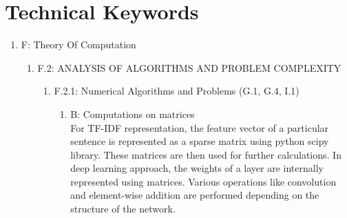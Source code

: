 \documentclass[oneside,a4paper,12pt]{book}
\begin{document}
\section{Technical Keywords}
\begin{enumerate}
	\item[] F: Theory Of Computation 
	\begin{enumerate}
		\item[] F.2: ANALYSIS OF ALGORITHMS AND PROBLEM COMPLEXITY 
		\begin{enumerate}
			\item[] F.2.1: Numerical Algorithms and Problems (G.1, G.4, I.1) 
			\begin{enumerate}
				\item[]  B: Computations on matrices \\
						For TF-IDF representation, the feature vector of a particular sentence is represented as a sparse matrix using python scipy library. These matrices are then used for further calculations. In deep learning approach, the weights of a layer are internally represented using matrices. Various operations like convolution and element-wise addition are performed depending on the structure of the network.
			\end{enumerate}
		\end{enumerate}
		

\end{enumerate}
\end{enumerate}
\end{document}
